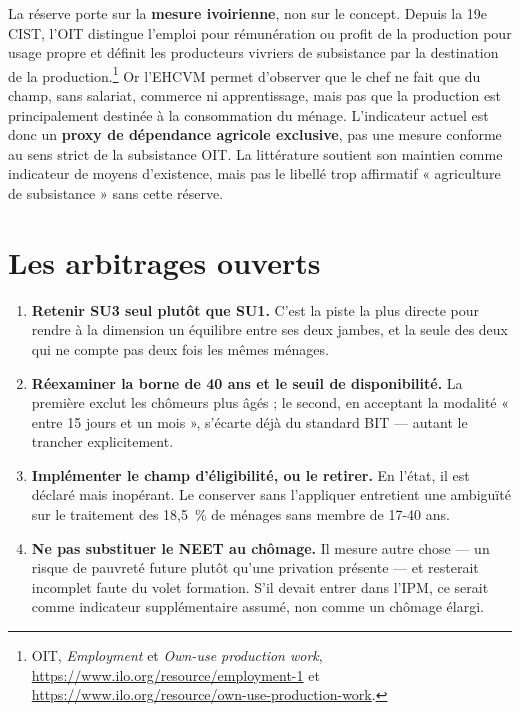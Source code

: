 \documentclass[11pt,a4paper]{article}
\begin{document}
La réserve porte sur la \textbf{mesure ivoirienne}, non sur le concept. Depuis la 19e CIST, l'OIT
distingue l'emploi pour rémunération ou profit de la production pour usage propre et définit les
producteurs vivriers de subsistance par la destination de la production.\footnote{OIT,
\emph{Employment} et \emph{Own-use production work},
\url{https://www.ilo.org/resource/employment-1} et
\url{https://www.ilo.org/resource/own-use-production-work}.} Or l'EHCVM permet d'observer que le
chef ne fait que du champ, sans salariat, commerce ni apprentissage, mais pas que la production est
principalement destinée à la consommation du ménage. L'indicateur actuel est donc un
\textbf{proxy de dépendance agricole exclusive}, pas une mesure conforme au sens strict de la
subsistance OIT. La littérature soutient son maintien comme indicateur de moyens d'existence, mais
pas le libellé trop affirmatif « agriculture de subsistance » sans cette réserve.

\section{Les arbitrages ouverts}

\begin{enumerate}
  \item \textbf{Retenir SU3 seul plutôt que SU1.} C'est la piste la plus directe pour rendre à la
  dimension un équilibre entre ses deux jambes, et la seule des deux qui ne compte pas deux fois
  les mêmes ménages.

  \item \textbf{Réexaminer la borne de 40 ans et le seuil de disponibilité.} La première exclut
  les chômeurs plus âgés ; le second, en acceptant la modalité « entre 15 jours et un mois »,
  s'écarte déjà du standard BIT --- autant le trancher explicitement.

  \item \textbf{Implémenter le champ d'éligibilité, ou le retirer.} En l'état, il est déclaré mais
  inopérant. Le conserver sans l'appliquer entretient une ambiguïté sur le traitement des
  18,5~\% de ménages sans membre de 17-40 ans.

  \item \textbf{Ne pas substituer le NEET au chômage.} Il mesure autre chose --- un risque de
  pauvreté future plutôt qu'une privation présente --- et resterait incomplet faute du volet
  formation. S'il devait entrer dans l'IPM, ce serait comme indicateur supplémentaire assumé, non
  comme un chômage élargi.
\end{enumerate}
\end{document}
